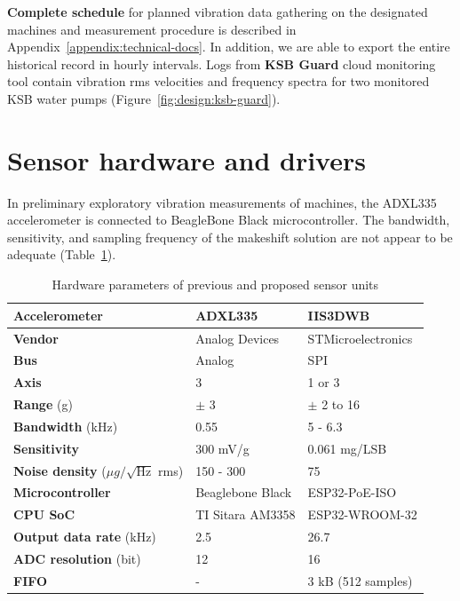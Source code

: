 \textbf{Complete schedule} for planned vibration data gathering on the designated machines and measurement procedure is described in Appendix~\ref{appendix:technical-docs}. In addition, we are able to export the entire historical record in hourly intervals. Logs from \textbf{KSB Guard} cloud monitoring tool contain vibration rms velocities and frequency spectra for two monitored KSB water pumps  (Figure~\ref{fig:design:ksb-guard}).


\section{Sensor hardware and drivers}
In preliminary exploratory vibration measurements of machines, the ADXL335 accelerometer is connected to BeagleBone Black microcontroller. The bandwidth, sensitivity, and sampling frequency of the makeshift solution are not appear to be adequate (Table~\ref{tab:design:hw-sensors}).

\begin{table}[ht]
\renewcommand{\arraystretch}{1.2}
\centering
\begin{tabular}{|l|l|l|}
\hline
\textbf{Accelerometer}                           & \textbf{ADXL335} & \textbf{IIS3DWB}   \\ \hline
\textbf{Vendor}                                  & Analog Devices   & STMicroelectronics \\ \hline
\textbf{Bus}                                     & Analog           & SPI                \\ \hline
\textbf{Axis}                                    & 3                & 1 or 3             \\ \hline
\textbf{Range} (g)                               & $\pm$ 3          & $\pm$ 2 to 16      \\ \hline
\textbf{Bandwidth} (kHz)                         & 0.55             & 5 - 6.3            \\ \hline
\textbf{Sensitivity}                             & 300 mV/g         & 0.061 mg/LSB       \\ \hline
\textbf{Noise density} ($\mu g / \sqrt{\mathrm{Hz}}$ rms) & 150 - 300        & 75                 \\ \hline
\textbf{Microcontroller}                         & Beaglebone Black & ESP32-PoE-ISO      \\ \hline
\textbf{CPU SoC}                                 & TI Sitara AM3358 & ESP32-WROOM-32     \\ \hline
\textbf{Output data rate} (kHz)                  & 2.5              & 26.7               \\ \hline
\textbf{ADC resolution} (bit)                    & 12               & 16                 \\ \hline
\textbf{FIFO}                                    & -                & 3 kB (512 samples) \\ \hline
\end{tabular}
\caption{Hardware parameters of previous and proposed sensor units}
\label{tab:design:hw-sensors}
\end{table}

